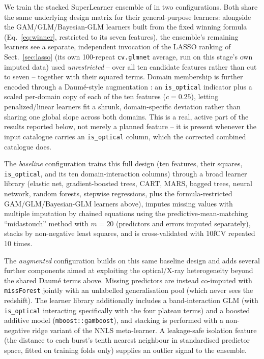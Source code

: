 \documentclass{aa}
\begin{document}
We train the stacked SuperLearner ensemble of \citet[Sect.~4.4]{narendra2025} in two
configurations. Both share the same underlying design matrix for their
general-purpose learners: alongside the GAM/GLM/Bayesian-GLM learners built from
the fixed winning formula (Eq.~\ref{eq:winner}, restricted to its seven features),
the ensemble's remaining learners see a separate, independent invocation of the
LASSO ranking of Sect.~\ref{sec:lasso} (its own 100-repeat \texttt{cv.glmnet}
average, run on this stage's own imputed data) used \emph{unrestricted} -- over all
ten candidate features rather than cut to seven -- together with their squared
terms. Domain membership is further encoded through a Daum\'e-style augmentation
\citep{daume2007}: an \texttt{is\_optical} indicator plus a scaled per-domain copy
of each of the ten features ($c=0.25$), letting penalized/linear learners fit a
shrunk, domain-specific deviation rather than sharing one global slope across both
domains. This is a real, active part of the results reported below, not merely a
planned feature -- it is present whenever the input catalogue carries an
\texttt{is\_optical} column, which the corrected combined catalogue does.

The \emph{baseline} configuration trains this full design (ten features, their
squares, \texttt{is\_optical}, and its ten domain-interaction columns) through a
broad learner library (elastic net, gradient-boosted trees, CART, MARS, bagged
trees, neural network, random forests, stepwise regressions, plus the
formula-restricted GAM/GLM/Bayesian-GLM learners above), imputes missing values
with multiple imputation by chained equations \citep[MICE;][]{vanbuuren2011} using
the predictive-mean-matching ``midastouch'' method with $m=20$ (predictors and
errors imputed separately), stacks by non-negative least squares, and is
cross-validated with 10fCV repeated 10 times.

The \emph{augmented} configuration builds on this same baseline design and adds
several further components aimed at exploiting the optical/X-ray heterogeneity
beyond the shared Daum\'e terms above. Missing predictors are instead co-imputed
with \texttt{missForest} \citep{stekhoven2012missforest} jointly with an unlabelled
generalisation pool (which never sees the redshift). The learner library
additionally includes a band-interaction GLM (with \texttt{is\_optical}
interacting specifically with the four plateau terms) and a boosted additive model
(\texttt{mboost::gamboost}), and stacking is performed with a non-negative ridge
variant of the NNLS meta-learner. A leakage-safe isolation feature (the distance to
each burst's tenth nearest neighbour in standardised predictor space, fitted on
training folds only) supplies an outlier signal to the ensemble.
\end{document}
